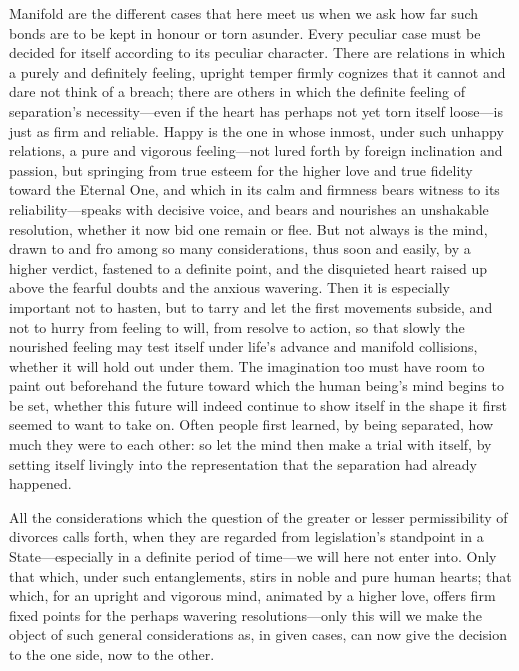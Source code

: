\documentclass[12pt,a4paper]{book}
\begin{document}
Manifold are the different cases that here meet us when we ask how far such
bonds are to be kept in honour or torn asunder. Every peculiar case must be
decided for itself according to its peculiar character. There are relations
in which a purely and definitely feeling, upright temper firmly cognizes
that it cannot and dare not think of a breach; there are others in which
the definite feeling of separation's necessity---even if the heart has
perhaps not yet torn itself loose---is just as firm and reliable. Happy is
the one in whose inmost, under such unhappy relations, a pure and vigorous
feeling---not lured forth by foreign inclination and passion, but springing
from true esteem for the higher love and true fidelity toward the Eternal
One, and which in its calm and firmness bears witness to its
reliability---speaks with decisive voice, and bears and nourishes an
unshakable resolution, whether it now bid one remain or flee. But not
always is the mind, drawn to and fro among so many considerations, thus
soon and easily, by a higher verdict, fastened to a definite point, and the
disquieted heart raised up above the fearful doubts and the anxious
wavering. Then it is especially important not to hasten, but to tarry and
let the first movements subside, and not to hurry from feeling to will,
from resolve to action, so that slowly the nourished feeling may test
itself under life's advance and manifold collisions, whether it will hold
out under them. The imagination too must have room to paint out beforehand
the future toward which the human being's mind begins to be set, whether
this future will indeed continue to show itself in the shape it first
seemed to want to take on. Often people first learned, by being separated,
how much they were to each other: so let the mind then make a trial with
itself, by setting itself livingly into the representation that the
separation had already happened.

All the considerations which the question of the greater or lesser
permissibility of divorces calls forth, when they are regarded from
legislation's standpoint in a State---especially in a definite period of
time---we will here not enter into. Only that which, under such
entanglements, stirs in noble and pure human hearts; that which, for an
upright and vigorous mind, animated by a higher love, offers firm fixed
points for the perhaps wavering resolutions---only this will we make the
object of such general considerations as, in given cases, can now give the
decision to the one side, now to the other.
\end{document}
